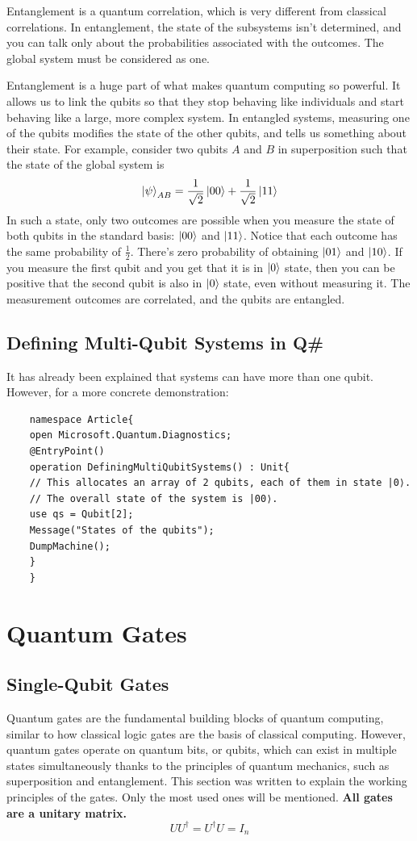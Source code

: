 \documentclass{article}
\begin{document}
Entanglement is a quantum correlation, which is very different from classical correlations. In entanglement, the state of the subsystems isn't determined, and you can talk only about the probabilities associated with the outcomes. The global system must be considered as one.

Entanglement is a huge part of what makes quantum computing so powerful. It allows us to link the qubits so that they stop behaving like individuals and start behaving like a large, more complex system. In entangled systems, measuring one of the qubits modifies the state of the other qubits, and tells us something about their state.
For example, consider two qubits ${A}$ and ${B}$ in superposition such that the state of the global system is
\begin{equation*}
    \ket{\psi}_{AB} = \frac{1}{\sqrt2}\ket{00} + \frac{1}{\sqrt2}\ket{11}
\end{equation*}
In such a state, only two outcomes are possible when you measure the state of both qubits in the standard basis: $\ket{00}$ and $\ket{11}$. Notice that each outcome has the same probability of $\frac{1}{2}$. There's zero probability of obtaining $\ket{01}$ and $\ket{10}$. If you measure the first qubit and you get that it is in $\ket{0}$ state, then you can be positive that the second qubit is also in $\ket{0}$ state, even without measuring it. The measurement outcomes are correlated, and the qubits are entangled.
\subsection{Defining Multi-Qubit Systems in Q\#}
It has already been explained that systems can have more than one qubit. However, for a more concrete demonstration:
\begin{verbatim}
    namespace Article{
    open Microsoft.Quantum.Diagnostics;
    @EntryPoint()
    operation DefiningMultiQubitSystems() : Unit{
    // This allocates an array of 2 qubits, each of them in state |0⟩.
    // The overall state of the system is |00⟩.
    use qs = Qubit[2];
    Message("States of the qubits");
    DumpMachine();
    }
    }
\end{verbatim}
\vspace{3cm}

\section{Quantum Gates}
\subsection{Single-Qubit Gates}
Quantum gates are the fundamental building blocks of quantum computing, similar to how classical logic gates are the basis of classical computing. However, quantum gates operate on quantum bits, or qubits, which can exist in multiple states simultaneously thanks to the principles of quantum mechanics, such as superposition and entanglement. This section was written to explain the working principles of the gates. Only the most used ones will be mentioned. 
\textbf{All gates are a unitary matrix.}
\begin{equation*}
    UU^\dagger = U^\dagger U = I_n
\end{equation*}
\end{document}
